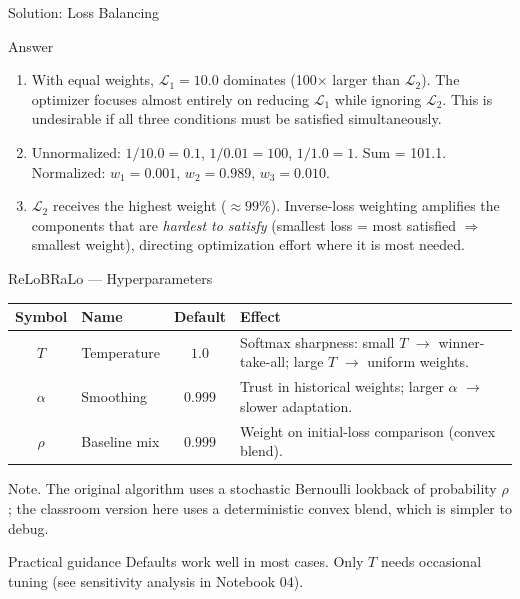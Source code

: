 \documentclass[aspectratio=169,11pt]{beamer}
\newcommand{\emphc}[1]{\textcolor{harvardcrimson}{#1}}
\begin{document}
\begin{frame}{Solution: Loss Balancing}
\begin{block}{Answer}
\begin{enumerate}
    \item With equal weights, $\mathcal{L}_1 = 10.0$ dominates (100$\times$ larger than $\mathcal{L}_2$). The optimizer focuses almost entirely on reducing $\mathcal{L}_1$ while ignoring $\mathcal{L}_2$. This is undesirable if all three conditions must be satisfied simultaneously.
    \item Unnormalized: $1/10.0 = 0.1$, $1/0.01 = 100$, $1/1.0 = 1$. Sum = 101.1.\\
    Normalized: $w_1 = 0.001$, $w_2 = 0.989$, $w_3 = 0.010$.
    \item $\mathcal{L}_2$ receives the highest weight ($\approx 99\%$). Inverse-loss weighting amplifies the components that are \emph{hardest to satisfy} (smallest loss = most satisfied $\Rightarrow$ smallest weight), directing optimization effort where it is most needed.
\end{enumerate}
\end{block}
\end{frame}

\begin{frame}{ReLoBRaLo --- Hyperparameters}
\small
\begin{center}
\footnotesize
\renewcommand{\arraystretch}{1.2}
\begin{tabular}{@{}c l c p{6.2cm}@{}}
\toprule
\textbf{Symbol} & \textbf{Name} & \textbf{Default} & \textbf{Effect} \\
\midrule
$T$      & Temperature   & $1.0$   & Softmax sharpness: small $T$ $\to$ winner-take-all; large $T$ $\to$ uniform weights. \\
$\alpha$ & Smoothing     & $0.999$ & Trust in historical weights; larger $\alpha$ $\to$ slower adaptation. \\
$\rho$   & Baseline mix  & $0.999$ & Weight on initial-loss comparison (convex blend). \\
\bottomrule
\end{tabular}
\end{center}

\vspace{0.25cm}
{\footnotesize \emphc{Note.} The original algorithm uses a stochastic Bernoulli lookback of probability $\rho$; the classroom version here uses a deterministic convex blend, which is simpler to debug.}

\vspace{0.15cm}
\begin{block}{Practical guidance}
Defaults work well in most cases. Only $T$ needs occasional tuning (see sensitivity analysis in Notebook 04).
\end{block}
\end{frame}
\end{document}

